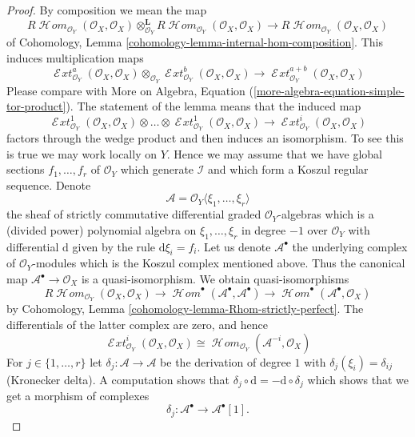 \documentclass{stacks-project}
\theoremstyle{plain}
\theoremstyle{definition}
\theoremstyle{remark}
\numberwithin{equation}{subsection}
\def\SheafHom{\mathop{\mathcal{H}\!\mathit{om}}\nolimits}
\def\SheafExt{\mathop{\mathcal{E}\!\mathit{xt}}\nolimits}
\begin{document}
\begin{proof}
By composition we mean the map
$$
R\SheafHom_{\mathcal{O}_Y}(\mathcal{O}_X, \mathcal{O}_X)
\otimes_{\mathcal{O}_Y}^\mathbf{L}
R\SheafHom_{\mathcal{O}_Y}(\mathcal{O}_X, \mathcal{O}_X)
\longrightarrow
R\SheafHom_{\mathcal{O}_Y}(\mathcal{O}_X, \mathcal{O}_X)
$$
of Cohomology, Lemma \ref{cohomology-lemma-internal-hom-composition}.
This induces multiplication maps
$$
\SheafExt^a_{\mathcal{O}_Y}(\mathcal{O}_X, \mathcal{O}_X)
\otimes_{\mathcal{O}_Y}
\SheafExt^b_{\mathcal{O}_Y}(\mathcal{O}_X, \mathcal{O}_X)
\longrightarrow
\SheafExt^{a + b}_{\mathcal{O}_Y}(\mathcal{O}_X, \mathcal{O}_X)
$$
Please compare with
More on Algebra, Equation (\ref{more-algebra-equation-simple-tor-product}).
The statement of the lemma means that the induced map
$$
\SheafExt^1_{\mathcal{O}_Y}(\mathcal{O}_X, \mathcal{O}_X)
\otimes \ldots \otimes
\SheafExt^1_{\mathcal{O}_Y}(\mathcal{O}_X, \mathcal{O}_X)
\longrightarrow
\SheafExt^i_{\mathcal{O}_Y}(\mathcal{O}_X, \mathcal{O}_X)
$$
factors through the wedge product and then induces an isomorphism.
To see this is true we may work locally on $Y$. Hence we may assume
that we have global sections $f_1, \ldots, f_r$ of $\mathcal{O}_Y$
which generate $\mathcal{I}$ and which form a Koszul regular sequence.
Denote
$$
\mathcal{A} = \mathcal{O}_Y\langle \xi_1, \ldots, \xi_r\rangle
$$
the sheaf of strictly commutative differential graded $\mathcal{O}_Y$-algebras
which is a (divided power) polynomial algebra on
$\xi_1, \ldots, \xi_r$ in degree $-1$ over $\mathcal{O}_Y$
with differential $\text{d}$ given by the rule $\text{d}\xi_i = f_i$.
Let us denote $\mathcal{A}^\bullet$ the underlying
complex of $\mathcal{O}_Y$-modules which is the Koszul complex
mentioned above. Thus the canonical map
$\mathcal{A}^\bullet \to \mathcal{O}_X$
is a quasi-isomorphism. We obtain quasi-isomorphisms
$$
R\SheafHom_{\mathcal{O}_Y}(\mathcal{O}_X, \mathcal{O}_X) \to
\SheafHom^\bullet(\mathcal{A}^\bullet, \mathcal{A}^\bullet) \to
\SheafHom^\bullet(\mathcal{A}^\bullet, \mathcal{O}_X)
$$
by Cohomology, Lemma \ref{cohomology-lemma-Rhom-strictly-perfect}.
The differentials of the latter complex are zero, and hence
$$
\SheafExt^i_{\mathcal{O}_Y}(\mathcal{O}_X, \mathcal{O}_X)
\cong \SheafHom_{\mathcal{O}_Y}(\mathcal{A}^{-i}, \mathcal{O}_X)
$$
For $j \in \{1, \ldots, r\}$ let $\delta_j : \mathcal{A} \to \mathcal{A}$
be the derivation of degree $1$ with $\delta_j(\xi_i) = \delta_{ij}$
(Kronecker delta). A computation shows that
$\delta_j \circ \text{d} = - \text{d} \circ \delta_j$ which shows that
we get a morphism of complexes
$$
\delta_j : \mathcal{A}^\bullet \to \mathcal{A}^\bullet[1].
$$
\end{proof}
\end{document}
